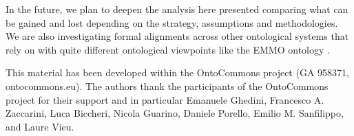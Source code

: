 \documentclass[ao]{iosart2x}
\begin{document}
In the future, we plan to deepen the analysis here presented comparing what can be gained and lost depending on the strategy, assumptions and methodologies. We are also investigating formal alignments across other ontological systems that rely on with quite different ontological viewpoints like the EMMO ontology \citep{EMMO}.


\begin{acks}
This material has been developed within the OntoCommons project (GA 958371, ontocommons.eu). The authors thank the participants of the OntoCommons project for their support and in particular Emanuele Ghedini, Francesco A. Zaccarini, Luca Biccheri, Nicola Guarino, Daniele Porello, Emilio M. Sanfilippo, and Laure Vieu.
\end{acks}

\nocite{label} 


\end{document}

